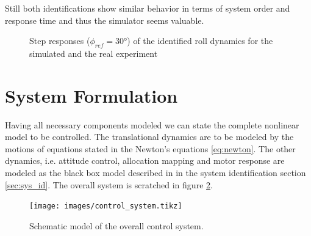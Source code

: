 Still both identifications show similar behavior in terms of system order and response time and thus the simulator seems valuable.
\begin{figure} 
\centering 
 
\caption{Step responses ($\phi_{ref} = 30 \si{\degree}$) of the identified roll dynamics for the simulated and the real experiment} 
\label{fig:sys_id_step_response} 
\end{figure}

\section{System Formulation}
Having all necessary components modeled we can state the complete nonlinear model to be controlled. The translational dynamics are to be modeled by the motions of equations stated in the Newton's equations \ref{eq:newton}. The other dynamics, i.e. attitude control, allocation mapping and motor response are modeled as the black box model described in in the system identification section \ref{sec:sys_id}. The overall system is scratched in figure \ref{pics:control_system}.

\begin{figure}
\centering
\texttt{[image: images/control\_system.tikz]}
\caption{Schematic model of the overall control system.}
\label{pics:control_system}
\end{figure}

